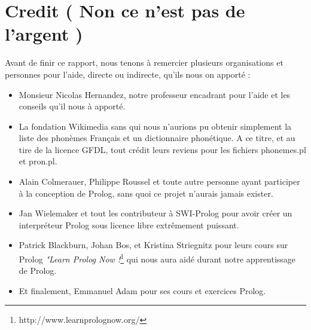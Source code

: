 \documentclass[11pt]{book}
\begin{document}
	\section{Credit ( Non ce n'est pas de l'argent )}
	Avant de finir ce rapport, nous tenons à remercier plusieurs organisations et personnes pour l'aide, directe ou indirecte, qu'ils nous on apporté :
	\begin{itemize}
		\item Monsieur Nicolas Hernandez, notre professeur encadrant pour l'aide et les conseils qu'il nous à apporté.
		\item La fondation Wikimedia sans qui nous n'aurions pu obtenir simplement la liste des phonèmes Français et un dictionnaire phonétique. A ce titre, et au tire de la licence GFDL, tout crédit leurs reviens pour les fichiers phonemes.pl et pron.pl.
		\item Alain Colmerauer, Philippe Roussel et toute autre personne ayant participer à la conception de Prolog, sans quoi ce projet n'aurais jamais exister.
		\item Jan Wielemaker et tout les contributeur à SWI-Prolog pour avoir créer un interpréteur Prolog sous licence libre extrêmement puissant.
		\item  Patrick Blackburn, Johan Bos, et Kristina Striegnitz pour leurs cours sur Prolog {\em "Learn Prolog Now !}\footnote{http://www.learnprolognow.org/} qui nous aura aidé durant notre apprentissage de Prolog.
		\item Et finalement, Emmanuel Adam pour ses cours et exercices Prolog.
	\end{itemize}
\end{document}
